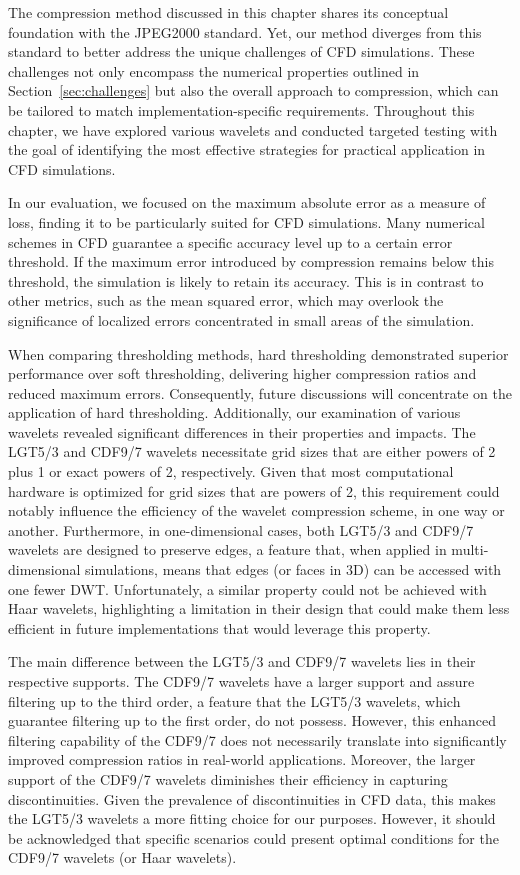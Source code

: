 The compression method discussed in this chapter shares its conceptual foundation with the JPEG2000 standard.
Yet, our method diverges from this standard to better address the unique challenges of CFD simulations.
These challenges not only encompass the numerical properties outlined in Section~\ref{sec:challenges} but also the overall approach to compression, which can be tailored to match implementation-specific requirements.
Throughout this chapter, we have explored various wavelets and conducted targeted testing with the goal of identifying the most effective strategies for practical application in CFD simulations.

In our evaluation, we focused on the maximum absolute error as a measure of loss, finding it to be particularly suited for CFD simulations.
Many numerical schemes in CFD guarantee a specific accuracy level up to a certain error threshold.
If the maximum error introduced by compression remains below this threshold, the simulation is likely to retain its accuracy.
This is in contrast to other metrics, such as the mean squared error, which may overlook the significance of localized errors concentrated in small areas of the simulation.

When comparing thresholding methods, hard thresholding demonstrated superior performance over soft thresholding, delivering higher compression ratios and reduced maximum errors.
Consequently, future discussions will concentrate on the application of hard thresholding.
Additionally, our examination of various wavelets revealed significant differences in their properties and impacts.
The LGT5/3 and CDF9/7 wavelets necessitate grid sizes that are either powers of 2 plus 1 or exact powers of 2, respectively.
Given that most computational hardware is optimized for grid sizes that are powers of 2, this requirement could notably influence the efficiency of the wavelet compression scheme, in one way or another.
Furthermore, in one-dimensional cases, both LGT5/3 and CDF9/7 wavelets are designed to preserve edges, a feature that, when applied in multi-dimensional simulations, means that edges (or faces in 3D) can be accessed with one fewer DWT.
Unfortunately, a similar property could not be achieved with Haar wavelets, highlighting a limitation in their design that could make them less efficient in future implementations that would leverage this property.

The main difference between the LGT5/3 and CDF9/7 wavelets lies in their respective supports.
The CDF9/7 wavelets have a larger support and assure filtering up to the third order, a feature that the LGT5/3 wavelets, which guarantee filtering up to the first order, do not possess.
However, this enhanced filtering capability of the CDF9/7 does not necessarily translate into significantly improved compression ratios in real-world applications.
Moreover, the larger support of the CDF9/7 wavelets diminishes their efficiency in capturing discontinuities.
Given the prevalence of discontinuities in CFD data, this makes the LGT5/3 wavelets a more fitting choice for our purposes.
However, it should be acknowledged that specific scenarios could present optimal conditions for the CDF9/7 wavelets (or Haar wavelets).

